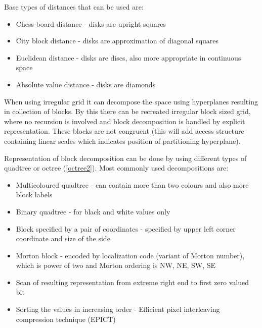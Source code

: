 Base types of distances that can be used are:
\begin{itemize}
\item Chess-board distance - disks are upright squares
\item City block distance - disks are approximation of diagonal squares
\item Euclidean distance - disks are discs, also more appropriate in continuous space
\item Absolute value distance - disks are diamonds
\end{itemize}

When using irregular grid it can decompose the space using hyperplanes resulting in collection of blocks. By this there can be recreated irregular block sized grid, where no recursion is involved and block decomposition is handled by explicit representation. These blocks are not congruent (this will add access structure containing linear scales which indicates position of partitioning hyperplane).

Representation of block decomposition can be done by using different types of quadtree or octree (\ref{octree2}). Most commonly used decompositions are:
\begin{itemize}
\item Multicoloured quadtree - can contain more than two colours and also more block labels
\item Binary quadtree - for black and white values only
\item Block specified by a pair of coordinates - specified by upper left corner coordinate and size of the side
\item Morton block - encoded by localization code (variant of Morton number), which is power of two and Morton ordering is NW, NE, SW, SE
\item Scan of resulting representation from extreme right end to first zero valued bit
\item Sorting the values in increasing order - Efficient pixel interleaving compression technique (EPICT)
\end{itemize}

